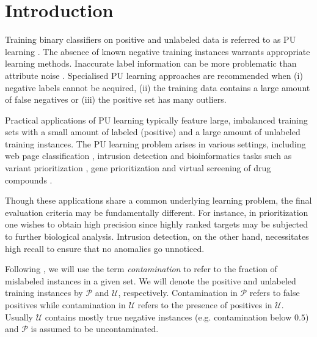 \documentclass[preprint,elsarticle-num,12pt]{elsarticle}
\begin{document}


\section{Introduction}

Training binary classifiers on positive and unlabeled data is referred to as PU learning \citep{Liu:2003:BTC:951949.952139}. The absence of known negative training instances warrants appropriate learning methods. Inaccurate label information can be more problematic than attribute noise \citep{zhu2004class}. Specialised PU learning approaches are recommended when (i) negative labels cannot be acquired, (ii) the training data contains a large amount of false negatives or (iii) the positive set has many outliers.

Practical applications of PU learning typically feature large, imbalanced training sets with a small amount of labeled (positive) and a large amount of unlabeled training instances. The PU learning problem arises in various settings, including web page classification \citep{Yu02pebl:positive}, intrusion detection \citep{Lazarevic03acomparative} and bioinformatics tasks such as variant prioritization \citep{sifrim2013extasy}, gene prioritization \citep{citeulike:615632, mordelet2011prodige} and virtual screening of drug compounds \citep{citeulike:3911}. 

Though these applications share a common underlying learning problem, the final evaluation criteria may be fundamentally different. For instance, in  prioritization one wishes to obtain high precision since highly ranked targets may be subjected to further biological analysis. Intrusion detection, on the other hand, necessitates high recall to ensure that no anomalies go unnoticed.


Following \citet{mordelet2014bagging}, we will use the term \emph{contamination} to refer to the fraction of mislabeled instances in a given set. We will denote the positive and unlabeled training instances by $\mathcal{P}$ and $\mathcal{U}$, respectively. Contamination in $\mathcal{P}$ refers to false positives while contamination in $\mathcal{U}$ refers to the presence of positives in $\mathcal{U}$. Usually $\mathcal{U}$ contains mostly true negative instances (e.g. contamination below $0.5$) and $\mathcal{P}$ is assumed to be uncontaminated. 
\end{document}
